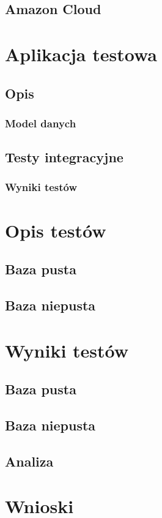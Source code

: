 \documentclass[a4paper,12pt,twoside,openany]{report}
\begin{document}
\section{Amazon Cloud}

\chapter{Aplikacja testowa}
\section{Opis}
\subsection{Model danych}
\section{Testy integracyjne}
\subsection{Wyniki testów}

\chapter{Opis testów}
\section{Baza pusta}
\section{Baza niepusta}

\chapter{Wyniki testów}
\section{Baza pusta}
\section{Baza niepusta}
\section{Analiza}

\chapter{Wnioski}
\end{document}
